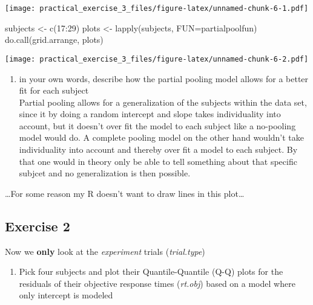 \documentclass[
]{article}
\newenvironment{Shaded}{\begin{snugshade}}{\end{snugshade}}
\newcommand{\AttributeTok}[1]{\textcolor[rgb]{0.77,0.63,0.00}{#1}}
\newcommand{\DecValTok}[1]{\textcolor[rgb]{0.00,0.00,0.81}{#1}}
\newcommand{\FunctionTok}[1]{\textcolor[rgb]{0.00,0.00,0.00}{#1}}
\newcommand{\NormalTok}[1]{#1}
\newcommand{\OtherTok}[1]{\textcolor[rgb]{0.56,0.35,0.01}{#1}}
\newcommand{\SpecialCharTok}[1]{\textcolor[rgb]{0.00,0.00,0.00}{#1}}
\providecommand{\tightlist}{%
  \setlength{\itemsep}{0pt}\setlength{\parskip}{0pt}}
\begin{document}
\texttt{[image: practical\_exercise\_3\_files/figure-latex/unnamed-chunk-6-1.pdf]}

\begin{Shaded}
\begin{Highlighting}[]
\NormalTok{subjects }\OtherTok{\textless{}{-}} \FunctionTok{c}\NormalTok{(}\DecValTok{17}\SpecialCharTok{:}\DecValTok{29}\NormalTok{)}
\NormalTok{plots }\OtherTok{\textless{}{-}} \FunctionTok{lapply}\NormalTok{(subjects, }\AttributeTok{FUN=}\NormalTok{partialpoolfun)}
\FunctionTok{do.call}\NormalTok{(grid.arrange,  plots)}
\end{Highlighting}
\end{Shaded}

\texttt{[image: practical\_exercise\_3\_files/figure-latex/unnamed-chunk-6-2.pdf]}

\begin{enumerate}
\def\labelenumi{\alph{enumi}.}
\setcounter{enumi}{21}
\tightlist
\item
  in your own words, describe how the partial pooling model allows for a
  better fit for each subject\\
  Partial pooling allows for a generalization of the subjects within the
  data set, since it by doing a random intercept and slope takes
  individuality into account, but it doesn't over fit the model to each
  subject like a no-pooling model would do. A complete pooling model on
  the other hand wouldn't take individuality into account and thereby
  over fit a model to each subject. By that one would in theory only be
  able to tell something about that specific subjcet and no
  generalization is then possible.
\end{enumerate}

\ldots For some reason my R doesn't want to draw lines in this
plot\ldots{}

\hypertarget{exercise-2}{%
\subsection{Exercise 2}\label{exercise-2}}

Now we \textbf{only} look at the \emph{experiment} trials
(\emph{trial.type})

\begin{enumerate}
\def\labelenumi{\arabic{enumi})}
\tightlist
\item
  Pick four subjects and plot their Quantile-Quantile (Q-Q) plots for
  the residuals of their objective response times (\emph{rt.obj}) based
  on a model where only intercept is modeled
\end{enumerate}
\end{document}
